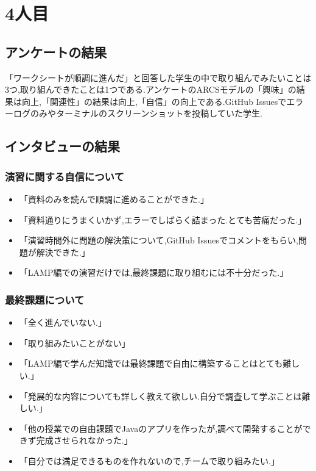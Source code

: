 \documentclass[11pt, a4paper]{jreport}
\begin{document}
\section{4人目}

\subsection{アンケートの結果}

「ワークシートが順調に進んだ」と回答した学生の中で取り組んでみたいことは3つ,取り組んできたことは1つである.アンケートのARCSモデルの「興味」の結果は向上,「関連性」の結果は向上,「自信」の向上である.GitHub Issuesでエラーログのみやターミナルのスクリーンショットを投稿していた学生.

\subsection{インタビューの結果}

\subsubsection{演習に関する自信について}

\begin{itemize}
\item 「資料のみを読んで順調に進めることができた.」
\item 「資料通りにうまくいかず,エラーでしばらく詰まった.とても苦痛だった.」
\item 「演習時間外に問題の解決策について,GitHub Issuesでコメントをもらい,問題が解決できた.」
\item 「LAMP編での演習だけでは,最終課題に取り組むには不十分だった.」
\end{itemize}

\subsubsection{最終課題について}

\begin{itemize}
\item 「全く進んでいない.」
\item 「取り組みたいことがない」
\item 「LAMP編で学んだ知識では最終課題で自由に構築することはとても難しい.」
\item 「発展的な内容についても詳しく教えて欲しい.自分で調査して学ぶことは難しい.」
\item 「他の授業での自由課題でJavaのアプリを作ったが,調べて開発することができず完成させられなかった.」
\item 「自分では満足できるものを作れないので,チームで取り組みたい.」
\end{itemize}
\end{document}
